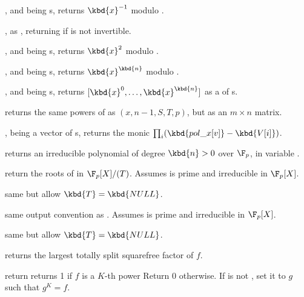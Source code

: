 ,  and
 being s, returns $\kbd{x}^{-1}$ modulo .

 , as ,
returning  if  is not invertible.

,  and
 being s, returns $\kbd{x}^2$ modulo .

,  and
 being s, returns $\kbd{x}^\kbd{n}$ modulo .

,  and
 being s, returns $[\kbd{x}^0, \dots, \kbd{x}^\kbd{n}]$ as a
 of s.

returns the same powers of  as $(x, n-1,S, T, p)$,
but as an $m\times n$ matrix.

,
 being a vector of s, returns the monic 
$\prod_i (\kbd{pol\_x[v]} - \kbd{V[i]})$.


 returns an irreducible polynomial
of degree $\kbd{n} > 0$ over $\F_p$, in variable .


 return the roots of  in
$\F_p[X]/(T)$. Assumes  is prime and  irreducible in $\F_p[X]$.

 same but allow $\kbd{T} = \kbd{NULL}$.

 same output convention as
. Assumes  is prime and  irreducible
in $\F_p[X]$.

 same but allow $\kbd{T} = \kbd{NULL}$.

 returns the largest totally
split squarefree factor of $f$.

 return
returns 1 if  $f$ is a $K$-th power Return $0$
otherwise. If  is not , set it to $g$ such that $g^K = f$.

